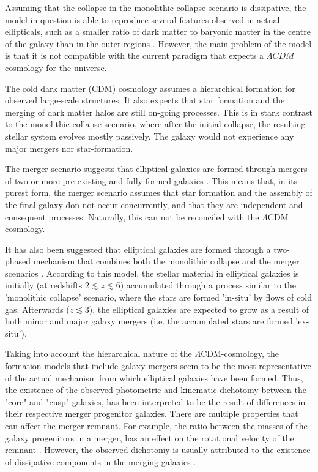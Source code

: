\documentclass[english, twoside]{HYgradu}
\begin{document}
Assuming that the collapse in the monolithic collapse scenario is dissipative, the model in question is able to reproduce several features observed in actual ellipticals, such as a smaller ratio of dark matter to baryonic matter in the centre of the galaxy than in the outer regions \citep{GalaxyFormationAndEvo2010}. However, the main problem of the model is that it is not compatible with the current paradigm that expects a $\Lambda CDM$ cosmology for the universe. 

The cold dark matter (CDM) cosmology assumes a hierarchical formation for observed large-scale structures. It also expects that star formation and the merging of dark matter halos are still on-going processes. This is in stark contrast to the monolithic collapse scenario, where after the initial collapse, the resulting stellar system evolves mostly passively. The galaxy would not experience any major mergers nor star-formation.

The merger scenario suggests that elliptical galaxies are formed through mergers of two or more pre-existing and fully formed galaxies \citep{GalaxyFormationAndEvo2010}. This means that, in its purest form, the merger scenario assumes that star formation and the assembly of the final galaxy don not occur concurrently, and that they are independent and consequent processes. Naturally, this can not be reconciled with the $\Lambda \mathrm{CDM}$ cosmology.

It has also been suggested that elliptical galaxies are formed through a two-phased mechanism that combines both the monolithic collapse and the merger scenarios \citep[e.g.][]{Oser2010}. According to this model, the stellar material in elliptical galaxies is initially (at redshifts $2 \lesssim z \lesssim 6$) accumulated through a process similar to the 'monolithic collapse' scenario, where the stars are formed 'in-situ' by flows of cold gas. Afterwards ($z \lesssim 3$), the elliptical galaxies are expected to grow as a result of both minor and major galaxy mergers (i.e. the accumulated stars are formed 'ex-situ'). 

Taking into account the hierarchical nature of the $\Lambda \mathrm{CDM}$-cosmology, the formation models that include galaxy mergers seem to be the most representative of the actual mechanism from which elliptical galaxies have been formed. Thus, the existence of the observed photometric and kinematic dichotomy between the "core" and "cusp" galaxies, has been interpreted to be the result of differences in their respective merger progenitor galaxies. There are multiple properties that can affect the merger remnant. For example, the ratio between the masses of the galaxy progenitors in a merger, has an effect on the rotational velocity of the remnant \citep{Naab2003}. However, the observed dichotomy is usually attributed to the existence of dissipative components in the merging galaxies \citep{GalaxyFormationAndEvo2010}.
\end{document}
